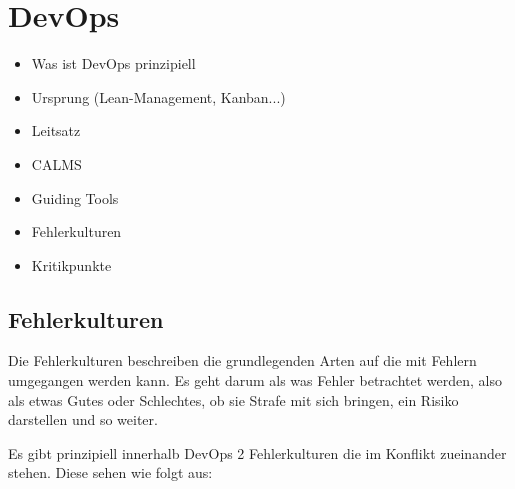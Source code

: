 \chapter{DevOps}



\begin{itemize}
\item Was ist \ac{DevOps} prinzipiell
\item Ursprung (Lean-Management, Kanban...)
\item Leitsatz
\item CALMS
\item Guiding Tools
\item Fehlerkulturen
\item Kritikpunkte
\end{itemize}

\section{Fehlerkulturen}\label{chap:fehler}

Die Fehlerkulturen beschreiben die grundlegenden Arten auf die mit Fehlern umgegangen werden kann. Es geht darum als was Fehler betrachtet werden, also als etwas Gutes oder Schlechtes, ob sie Strafe mit sich bringen, ein Risiko darstellen und so weiter.

Es gibt prinzipiell innerhalb \ac{DevOps} 2 Fehlerkulturen die im Konflikt zueinander stehen. Diese sehen wie folgt aus:

